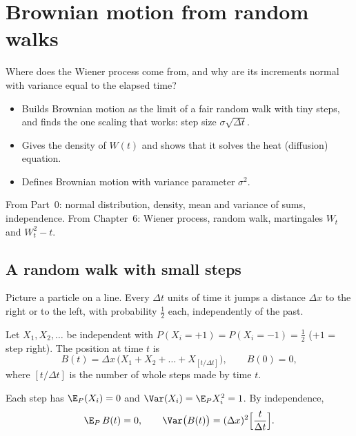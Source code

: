 \chapter{Brownian motion from random walks}
\label{ch:bm-walks}

\begin{question}
Where does the Wiener process come from, and why are its increments normal with variance equal to the elapsed time?
\end{question}

\begin{whatfor}
\begin{itemize}
  \item Builds Brownian motion as the limit of a fair random walk with tiny steps, and finds the one scaling that works: step size $\sigma\sqrt{\Delta t}$.
  \item Gives the density of $W(t)$ and shows that it solves the heat (diffusion) equation.
  \item Defines Brownian motion with variance parameter $\sigma^2$.
\end{itemize}
\end{whatfor}

\begin{prereq}
From Part~0: normal distribution, density, mean and variance of sums, independence. From Chapter~6: Wiener process, random walk, martingales $W_t$ and $W_t^2-t$.
\end{prereq}

\section{A random walk with small steps}

Picture a particle on a line. Every $\Delta t$ units of time it jumps a distance $\Delta x$ to the right or to the left, with probability $\frac12$ each, independently of the past.

\begin{setup}
Let $X_1,X_2,\ldots$ be independent with $P(X_i=+1)=P(X_i=-1)=\frac12$ ($+1$ = step right). The position at time $t$ is
\[
  B(t)=\Delta x\,\big(X_1+X_2+\dots+X_{[t/\Delta t]}\big),\qquad B(0)=0,
\]
where $[t/\Delta t]$ is the number of whole steps made by time $t$.
\end{setup}

Each step has $\E_P(X_i)=0$ and $\Var(X_i)=\E_PX_i^2=1$. By independence,
\[
  \E_P\,B(t)=0,\qquad \Var\big(B(t)\big)=(\Delta x)^2\Big[\frac{t}{\Delta t}\Big].
\]

